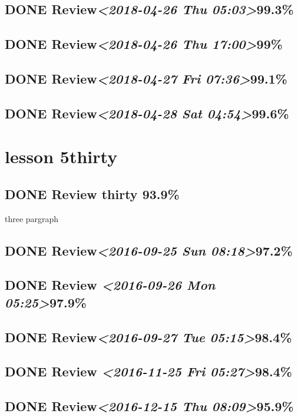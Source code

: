 \documentclass[11pt]{ctexart}
\begin{document}
\subsection{{\bfseries\sffamily DONE} Review\textit{<2018-04-26 Thu 05:03>}99.3\%}
\label{sec:orgfd704c9}
\subsection{{\bfseries\sffamily DONE} Review\textit{<2018-04-26 Thu 17:00>}99\%}
\label{sec:orge952020}
\subsection{{\bfseries\sffamily DONE} Review\textit{<2018-04-27 Fri 07:36>}99.1\%}
\label{sec:org2809224}
\subsection{{\bfseries\sffamily DONE} Review\textit{<2018-04-28 Sat 04:54>}99.6\%}
\label{sec:org0a70167}
\section{lesson 5thirty}
\label{sec:org4439990}
\subsection{{\bfseries\sffamily DONE} Review thirty 93.9\%}
\label{sec:orgdd899ac}
three pargraph
\subsection{{\bfseries\sffamily DONE} Review\textit{<2016-09-25 Sun 08:18>}97.2\%}
\label{sec:org6a2c3d5}
\subsection{{\bfseries\sffamily DONE} Review \textit{<2016-09-26 Mon 05:25>}97.9\%}
\label{sec:org1aadcf1}
\subsection{{\bfseries\sffamily DONE} Review\textit{<2016-09-27 Tue 05:15>}98.4\%}
\label{sec:orgdb57c67}
\subsection{{\bfseries\sffamily DONE} Review \textit{<2016-11-25 Fri 05:27>}98.4\%}
\label{sec:orge4460e4}
\subsection{{\bfseries\sffamily DONE} Review\textit{<2016-12-15 Thu 08:09>}95.9\%}
\label{sec:orgbfdd39d}
\end{document}
